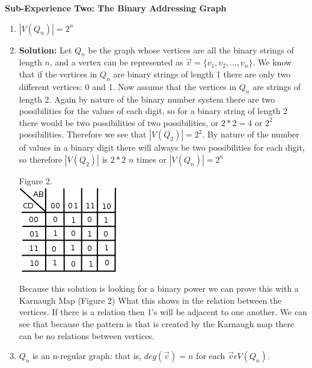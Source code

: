 \documentclass[10pt,a4paper]{report}
\begin{document}
	\textbf{Sub-Experience Two: The Binary Addressing Graph}
		\begin{enumerate}
			\item $|V(Q_n)| = 2^n$
			
			\item[] \textbf{Solution: }Let $Q_{n}$ be the graph whose vertices are all the binary strings of length $n$, and a vertex can be represented as $\vec{v} = \{v_{1}, v_{2}, ..., v_{n}\}$.  We know that if the vertices in $Q_{n}$ are binary strings of length 1 there are only two different vertices: 0 and 1.  Now assume that the vertices in $Q_{n}$ are strings of length 2.  Again by nature of the binary number system there are two possibilities for the values of each digit, so for a binary string of length 2 there would be two possibilities of two possibilities, or $2*2=4$ or $2^{2}$ possibilities.  Therefore we see that $|V(Q_{2})| = 2^{2}$. By nature of the number of values in a binary digit there will always be two possibilities for each digit, so therefore $|V(Q_{2})|$ is $2 * 2$ $n$ times or $|V(Q_{n})|=2^{n}$
			
			\begin{center}
				Figure 2.\\
				\includegraphics[scale=.5]{2_1.png}
			\end{center}
			Because this solution is looking for a binary power we can prove this with a Karnaugh Map (Figure 2) What this shows in the relation between the vertices.  If there is a relation then 1's will be adjacent to one another.  We can see that because the pattern is that is created by the Karnaugh map there can be no relations between vertices.
			\item $Q_n$ is an n-regular graph: that is, $deg (\vec{v}) = n $ for each $\vec{v} \epsilon V(Q_n)$.
			

\end{enumerate}
\end{document}
